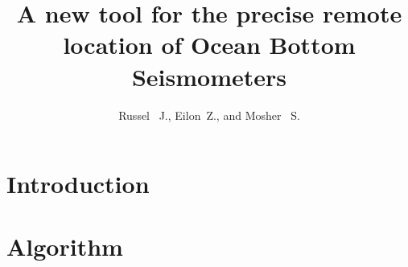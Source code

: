 \documentclass[11pt]{amsart}
\title{A new tool for the precise remote location of Ocean Bottom Seismometers}
\author{Russel ~J., Eilon~Z., and Mosher ~S. }
\begin{document}
\maketitle

\section{Introduction}


\section{Algorithm }


\newpage


\end{document}
